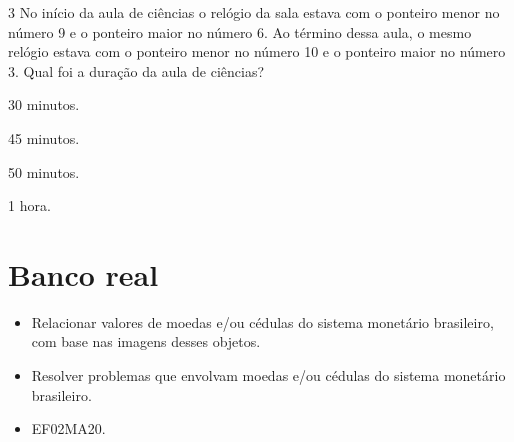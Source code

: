 \num{3} No início da aula de ciências o relógio da sala estava com o ponteiro
menor no número 9 e o ponteiro maior no número 6. Ao término dessa
aula, o mesmo relógio estava com o ponteiro menor no número
10 e o ponteiro maior no número 3. Qual foi a duração da aula de
ciências?

\begin{escolha}
\item 30 minutos.

\item 45 minutos.

\item 50 minutos.

\item 1 hora.
\end{escolha}

\chapter{Banco real}



\begin{itemize}
\item Relacionar valores de moedas e/ou cédulas do sistema monetário
brasileiro, com base nas imagens desses objetos.

\item Resolver problemas que envolvam moedas e/ou cédulas do sistema
monetário brasileiro.
\end{itemize}


\begin{itemize}
\item EF02MA20.
\end{itemize}

